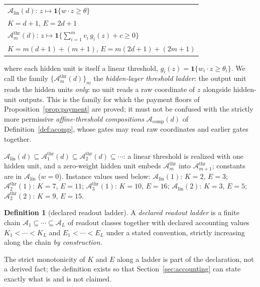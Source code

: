 \documentclass[twocolumn,10pt]{article}
\theoremstyle{definition}
\newtheorem{definition}[theorem]{Definition}
\theoremstyle{remark}
\newcommand{\cA}{\mathcal{A}}
\newcommand{\Alin}{\cA_{\mathrm{lin}}}
\newcommand{\Athr}[1]{\cA^{\mathrm{thr}}_{#1}}
\begin{document}
\begin{center}
\small
\begin{tabular}{@{}l@{}}
\toprule
$\Alin(d)$: \quad $z \mapsto \mathbf 1\{w \cdot z \ge \theta\}$ \\
\hspace*{1.2em}$K = d + 1$, \quad $E = 2d + 1$ \\
\addlinespace
$\Athr{m}(d)$: \quad
$z \mapsto \mathbf 1\{\sum_{i=1}^m v_i\, g_i(z) + c \ge 0\}$ \\
\hspace*{1.2em}$K = m(d{+}1) + (m{+}1)$, \quad
$E = m(2d{+}1) + (2m{+}1)$ \\
\bottomrule
\end{tabular}
\end{center}

\noindent
where each hidden unit is itself a linear threshold,
$g_i(z) = \mathbf 1\{w_i \cdot z \ge \theta_i\}$. We call the family
$\{\Athr{m}(d)\}_m$ the \emph{hidden-layer threshold ladder}: the
output unit reads the hidden units \emph{only}: no unit reads a raw
coordinate of $z$ alongside hidden-unit outputs. This is the family for
which the payment floors of Proposition~\ref{prop:payment} are proved;
it must not be confused with the strictly more permissive
\emph{affine-threshold compositions} $\cA_{\mathrm{comp}}(d)$ of
Definition~\ref{def:acomp}, whose gates may read raw coordinates and
earlier gates together.

$\Alin(d) \subseteq \Athr{1}(d) \subseteq \Athr{2}(d) \subseteq \cdots$: a
linear threshold is realized with one hidden unit, and a zero-weight hidden
unit embeds $\Athr{m}$ into $\Athr{m+1}$; constants are in $\Alin$
($w = 0$). Instance values used below: $\Alin(1)$: $K = 2$, $E = 3$;
$\Athr{2}(1)$: $K = 7$, $E = 11$; $\Athr{3}(1)$: $K = 10$, $E = 16$;
$\Alin(2)$: $K = 3$, $E = 5$; $\Athr{2}(2)$: $K = 9$, $E = 15$.

\begin{definition}[declared readout ladder]
\label{def:ladder}
A \emph{declared readout ladder} is a finite chain
$\cA_1 \subseteq \cdots \subseteq \cA_L$ of readout classes together with
declared accounting values $K_1 < \cdots < K_L$ and $E_1 < \cdots < E_L$
under a stated convention, strictly increasing along the chain \emph{by
construction}.
\end{definition}

The strict monotonicity of $K$ and $E$ along a ladder is part of the
declaration, not a derived fact; the definition exists so that
Section~\ref{sec:accounting} can state exactly what is and is not claimed.
\end{document}
